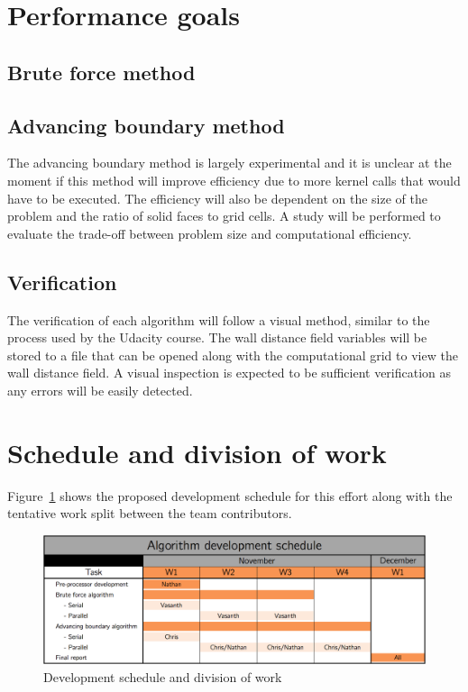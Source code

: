 \documentclass[]{aiaa-tc}%
\begin{document}
\section{Performance goals}

\subsection{Brute force method}

\subsection{Advancing boundary method}
The advancing boundary method is largely experimental and it is
unclear at the moment if this method will improve efficiency due to
more kernel calls that would have to be executed. The efficiency will
also be dependent on the size of the problem and the ratio of solid
faces to grid cells. A study will be performed to evaluate the
trade-off between problem size and computational efficiency.

\subsection{Verification}
The verification of each algorithm will follow a visual method,
similar to the process used by the Udacity course. The wall distance
field variables will be stored to a file that can be opened along with
the computational grid to view the wall distance field. A visual
inspection is expected to be sufficient verification as any errors will
be easily detected.



\section{Schedule and division of work}
Figure~\ref{f:schedule} shows the proposed development schedule for
this effort along with the tentative work split between the team contributors.

\begin{figure}
  \centering
  \includegraphics[width=0.9\linewidth]{figures/schedule}
  \caption{Development schedule and division of work}
  \label{f:schedule}
\end{figure}

%
%
\end{document}
